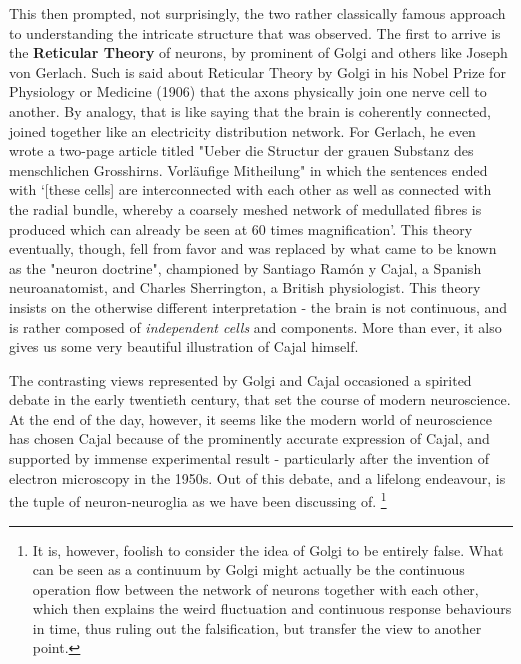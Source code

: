 This then prompted, not surprisingly, the two rather classically famous approach to understanding the intricate structure that was observed. The first to arrive is the \textbf{Reticular Theory} of neurons, by prominent of Golgi and others like Joseph von Gerlach. Such is said about Reticular Theory by Golgi in his Nobel Prize for Physiology or Medicine (1906) that the axons physically join one nerve cell to another. By analogy, that is like saying that the brain is coherently connected, joined together like an electricity distribution network. For Gerlach, he even wrote a two-page article titled "Ueber die Structur der grauen Substanz des menschlichen Grosshirns. Vorläufige Mitheilung" \cite{gerlach1872struktur} in which the sentences ended with `[these cells] are interconnected with each other as well as connected with the radial bundle, whereby a coarsely meshed network of medullated fibres is produced which can already be seen at 60 times magnification'. This theory eventually, though, fell from favor and was replaced by what came to be known as the "neuron doctrine", championed by Santiago Ramón y Cajal, a Spanish neuroanatomist, and Charles Sherrington, a British physiologist. This theory insists on the otherwise different interpretation - the brain is not continuous, and is rather composed of \textit{independent cells} and components.  More than ever, it also gives us some very beautiful illustration of Cajal himself. 

The contrasting views represented by Golgi and Cajal occasioned a spirited debate in the early twentieth century, that set the course of modern neuroscience. At the end of the day, however, it seems like the modern world of neuroscience has chosen Cajal because of the prominently accurate expression of Cajal, and supported by immense experimental result - particularly after the invention of electron microscopy in the 1950s. Out of this debate, and a lifelong endeavour, is the tuple of neuron-neuroglia as we have been discussing of. \footnote{It is, however, foolish to consider the idea of Golgi to be entirely false. What can be seen as a continuum by Golgi might actually be the continuous operation flow between the network of neurons together with each other, which then explains the weird fluctuation and continuous response behaviours in time, thus ruling out the falsification, but transfer the view to another point. }

